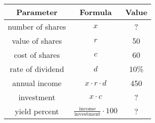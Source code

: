 \begin{tabular}{|c|c|c|}
\hline
\textbf{Parameter} & \textbf{Formula} & \textbf{Value} \\
\hline
number of shares & \(x\) & ? \\
\hline
value of shares & \(r\) & 50 \\
\hline
cost of shares & \(c\) & 60 \\
\hline
rate of dividend & \(d\) & 10\% \\
\hline
annual income &  \( x \cdot r \cdot d \) & 450 \\
\hline
investment & \(x \cdot c \) & ? \\
\hline
yield percent &  \( \displaystyle{ \frac{\text{income}}{\text{investment}}} \cdot 100 \) & ? \\
\hline

\end{tabular}
